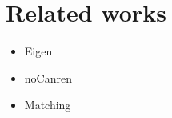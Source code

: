 
\section{Related works}
\label{sec:related}

\begin{itemize}
\item Eigen 
\item noCanren 
\item Matching 
\end{itemize}




